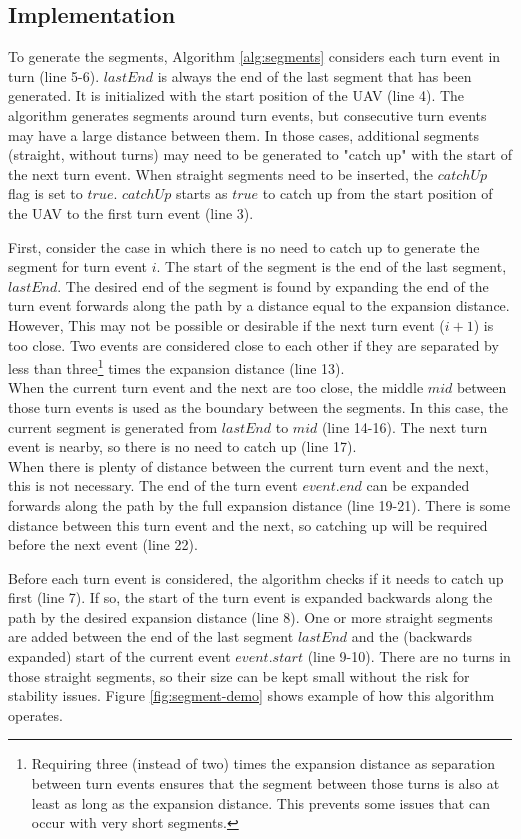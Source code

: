 \subsection{Implementation}
To generate the segments, Algorithm \ref{alg:segments} considers each turn event in turn (line 5-6). $lastEnd$ is always the end of the last segment that has been generated. It is initialized with the start position of the UAV (line 4). The algorithm generates segments around turn events, but consecutive turn events may have a large distance between them. In those cases, additional segments (straight, without turns) may need to be generated to "catch up" with the start of the next turn event. When straight segments need to be inserted, the $catchUp$ flag is set to $true$. $catchUp$ starts as $true$ to catch up from the start position of the UAV to the first turn event (line 3).
\par
First, consider the case in which there is no need to catch up to generate the segment for turn event $i$. The start of the segment is the end of the last segment, $lastEnd$. The desired end of the segment is found by expanding the end of the turn event forwards along the path by a distance equal to the expansion distance. However, This may not be possible or desirable if the next turn event ($i+1$) is too close. Two events are considered close to each other if they are separated by less than three\footnote{Requiring three (instead of two) times the expansion distance as separation between turn events ensures that the segment between those turns is also at least as long as the expansion distance. This prevents some issues that can occur with very short segments.} times the expansion distance (line 13). \\
When the current turn event and the next are too close, the middle $mid$ between those turn events is used as the boundary between the segments. In this case, the current segment is generated from $lastEnd$ to $mid$ (line 14-16). The next turn event is nearby, so there is no need to catch up (line 17). \\
When there is plenty of distance between the current turn event and the next, this is not necessary. The end of the turn event $event.end$ can be expanded forwards along the path by the full expansion distance (line 19-21). There is some distance between this turn event and the next, so catching up will be required before the next event (line 22). \\
\par
Before each turn event is considered, the algorithm checks if it needs to catch up first (line 7). If so, the start of the turn event is expanded backwards along the path by the desired expansion distance (line 8). One or more straight segments are added between the end of the last segment $lastEnd$ and the (backwards expanded) start of the current event $event.start$ (line 9-10). There are no turns in those straight segments, so their size can be kept small without the risk for stability issues. Figure \ref{fig:segment-demo} shows example of how this algorithm operates.

